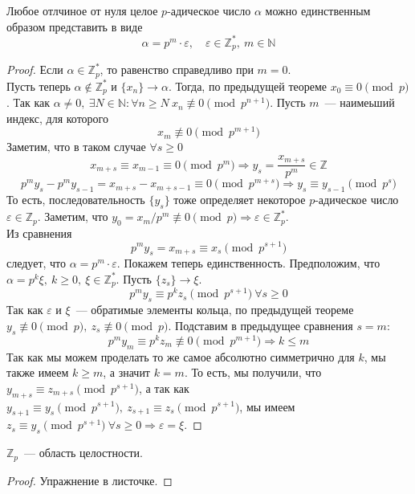 \documentclass[11pt]{report}
\begin{document}
    \begin{theorem}\label{predstp-adic}
        Любое отлчиное от нуля целое $p$-адическое число $\alpha$ можно единственным образом представить в виде
        \[ \alpha = p^m \cdot \varepsilon, \quad \varepsilon \in \mathbb{Z}_p^{*}, \ m \in \mathbb{N} \]

    \end{theorem}
    \begin{proof}
        Если $\alpha \in \mathbb{Z}_p^{*}$, то равенство справедливо при $m = 0$.\\
        Пусть теперь $\alpha \notin \mathbb{Z}_p^{*}$ и $\{ x_n \} \to \alpha$. Тогда, по предыдущей теореме
        $x_0 \equiv 0 \pmod{p}$. Так как $\alpha \neq 0, \ \exists N \in \mathbb{N}\colon \forall n \ge N \ x_n \not\equiv 0 \pmod{p^{n + 1}}$.
        Пусть $m$~--- наимеьший индекс, для которого
        \[ x_m \not\equiv 0 \pmod{p^{m + 1}}\]
        Заметим, что в таком случае $\forall s \ge 0$
        \[ x_{m + s} \equiv x_{m - 1} \equiv 0 \pmod{p^{m}} \Rightarrow y_s = \frac{x_{m + s}}{p^m} \in \mathbb{Z} \]
        \[ p^m y_s - p^m y_{s - 1}  = x_{m + s} - x_{m + s - 1} \equiv 0 \pmod{p^{m + s}} \Rightarrow y_s \equiv y_{s - 1} \pmod{p^s}\]
        То есть, последовательность $\{ y_s \}$ тоже определяет некоторое $p$-адическое число $\varepsilon \in \mathbb{Z}_p$.
        Заметим, что $y_0 = x_m/p^m \not\equiv 0 \pmod{p} \Rightarrow \varepsilon \in \mathbb{Z}_p^{*}$.\\
        Из сравнения
        \[ p^m y_s = x_{m + s} \equiv x_s \pmod{p^{s + 1}} \]
        следует, что $\alpha = p^m \cdot \varepsilon$.
        Покажем теперь единственность. Предположим, что $\alpha = p^k \xi, \ k \ge 0, \ \xi \in \mathbb{Z}_{p}^{*}$. Пусть $\{ z_s \} \to \xi$.
        \[ p^m y_s \equiv p^k z_s \pmod{p^{s + 1}} \ \forall s \ge 0 \]
        Так как $\varepsilon$ и $\xi$~--- обратимые элементы кольца, по предыдущей теореме $y_s \not\equiv 0 \pmod{p}, \ z_s \not\equiv 0 \pmod{p}$.
        Подставим в предыдущее сравнения $s = m$:
        \[ p^m y_m \equiv p^k z_m \not\equiv 0 \pmod{p^{m + 1}} \Rightarrow k \le m \]
        Так как мы можем проделать то же самое абсолютно симметрично для $k$, мы также имеем $k \ge m$, а значит
        $k = m$.
        То есть, мы получили, что $y_{m + s} \equiv z_{m + s} \pmod{p^{s + 1}}$, а так как $y_{s + 1} \equiv y_s \pmod{p^{s + 1}}, \ z_{s + 1} \equiv z_s \pmod{p^{s + 1}}$,
        мы имеем $z_s \equiv y_s \pmod{p^{s + 1}} \ \forall s \ge 0 \Rightarrow \varepsilon = \xi$.
    \end{proof}
    \begin{corollary}
        $\mathbb{Z}_p$~--- область целостности.
     \end{corollary}
    \begin{proof}
        Упражнение в листочке.
    \end{proof}
\end{document}
